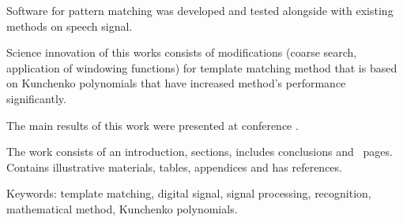 Software for pattern matching was developed and tested alongside with existing methods on speech signal.

Science innovation of this works consists of modifications (coarse search, application of windowing functions) for
template matching method that is based on Kunchenko polynomials that have increased method's performance
significantly.

The main results of this work were presented at conference .

The work consists of an introduction,  sections, includes conclusions and ~pages.
Contains  illustrative materials,  tables,  appendices and has
 references.

Keywords: template matching, digital signal, signal processing, recognition, mathematical method, Kunchenko
polynomials.

